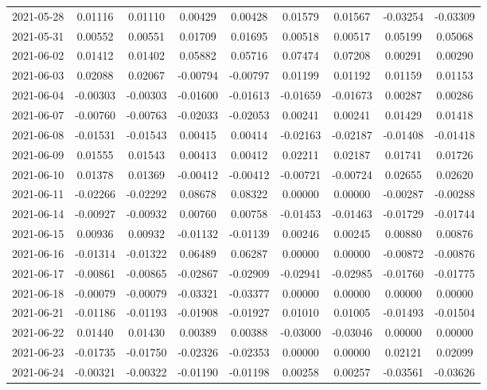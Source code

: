 {\begin{footnotesize}
\begin{longtable}{lcccccccc}
2021-05-28 & 0.01116 & 0.01110 & 0.00429 & 0.00428 & 0.01579 & 0.01567 & -0.03254 & -0.03309 \\
2021-05-31 & 0.00552 & 0.00551 & 0.01709 & 0.01695 & 0.00518 & 0.00517 & 0.05199 & 0.05068 \\
2021-06-02 & 0.01412 & 0.01402 & 0.05882 & 0.05716 & 0.07474 & 0.07208 & 0.00291 & 0.00290 \\
2021-06-03 & 0.02088 & 0.02067 & -0.00794 & -0.00797 & 0.01199 & 0.01192 & 0.01159 & 0.01153 \\
2021-06-04 & -0.00303 & -0.00303 & -0.01600 & -0.01613 & -0.01659 & -0.01673 & 0.00287 & 0.00286 \\
2021-06-07 & -0.00760 & -0.00763 & -0.02033 & -0.02053 & 0.00241 & 0.00241 & 0.01429 & 0.01418 \\
2021-06-08 & -0.01531 & -0.01543 & 0.00415 & 0.00414 & -0.02163 & -0.02187 & -0.01408 & -0.01418 \\
2021-06-09 & 0.01555 & 0.01543 & 0.00413 & 0.00412 & 0.02211 & 0.02187 & 0.01741 & 0.01726 \\
2021-06-10 & 0.01378 & 0.01369 & -0.00412 & -0.00412 & -0.00721 & -0.00724 & 0.02655 & 0.02620 \\
2021-06-11 & -0.02266 & -0.02292 & 0.08678 & 0.08322 & 0.00000 & 0.00000 & -0.00287 & -0.00288 \\
2021-06-14 & -0.00927 & -0.00932 & 0.00760 & 0.00758 & -0.01453 & -0.01463 & -0.01729 & -0.01744 \\
2021-06-15 & 0.00936 & 0.00932 & -0.01132 & -0.01139 & 0.00246 & 0.00245 & 0.00880 & 0.00876 \\
2021-06-16 & -0.01314 & -0.01322 & 0.06489 & 0.06287 & 0.00000 & 0.00000 & -0.00872 & -0.00876 \\
2021-06-17 & -0.00861 & -0.00865 & -0.02867 & -0.02909 & -0.02941 & -0.02985 & -0.01760 & -0.01775 \\
2021-06-18 & -0.00079 & -0.00079 & -0.03321 & -0.03377 & 0.00000 & 0.00000 & 0.00000 & 0.00000 \\
2021-06-21 & -0.01186 & -0.01193 & -0.01908 & -0.01927 & 0.01010 & 0.01005 & -0.01493 & -0.01504 \\
2021-06-22 & 0.01440 & 0.01430 & 0.00389 & 0.00388 & -0.03000 & -0.03046 & 0.00000 & 0.00000 \\
2021-06-23 & -0.01735 & -0.01750 & -0.02326 & -0.02353 & 0.00000 & 0.00000 & 0.02121 & 0.02099 \\
2021-06-24 & -0.00321 & -0.00322 & -0.01190 & -0.01198 & 0.00258 & 0.00257 & -0.03561 & -0.03626 \\

\end{longtable}
\end{footnotesize}}
